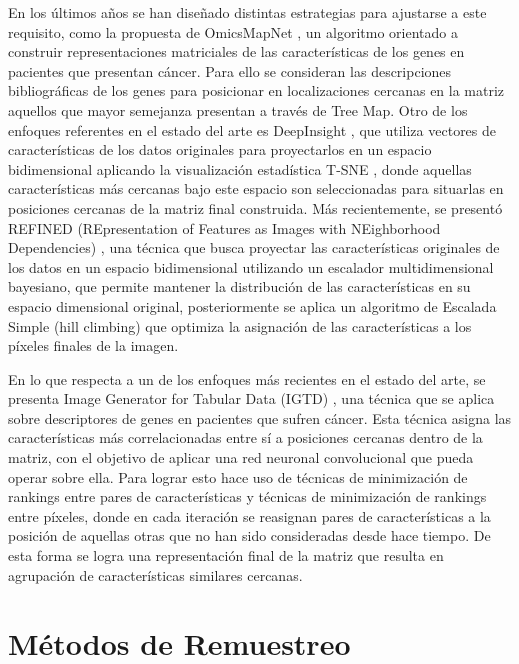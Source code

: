 \documentclass{uathesis-es}
\begin{document}
En los últimos años se han diseñado distintas estrategias para ajustarse a este requisito, como la propuesta de OmicsMapNet \cite{ma2019omicsmapnet}, un algoritmo orientado a construir representaciones matriciales de las características de los genes en pacientes que presentan cáncer. Para ello se consideran las descripciones bibliográficas de los genes para posicionar en localizaciones cercanas en la matriz aquellos que mayor semejanza presentan a través de Tree Map. Otro de los enfoques referentes en el estado del arte es DeepInsight \cite{Sharma2019}, que utiliza vectores de características de los datos originales para proyectarlos en un espacio bidimensional aplicando la visualización estadística T-SNE \cite{van2008visualizing}, donde aquellas características más cercanas bajo este espacio son seleccionadas para situarlas en posiciones cercanas de la matriz final construida. Más recientemente, se presentó REFINED (REpresentation of Features as Images with NEighborhood Dependencies) \cite{Bazgir2020}, una técnica que busca proyectar las características originales de los datos en un espacio bidimensional utilizando un escalador multidimensional bayesiano, que permite mantener la distribución de las características en su espacio dimensional original, posteriormente se aplica un algoritmo de Escalada Simple (hill climbing) que optimiza la asignación de las características a los píxeles finales de la imagen.

En lo que respecta a un de los enfoques más recientes en el estado del arte, se presenta Image Generator for Tabular Data (IGTD) \cite{Zhu2021}, una técnica que se aplica sobre descriptores de genes en pacientes que sufren cáncer. Esta técnica asigna las características más correlacionadas entre sí a posiciones cercanas dentro de la matriz, con el objetivo de aplicar una red neuronal convolucional que pueda operar sobre ella. Para lograr esto hace uso de técnicas de minimización de rankings entre pares de características y técnicas de minimización de rankings entre píxeles, donde en cada iteración se reasignan pares de características a la posición de aquellas otras que no han sido consideradas desde hace tiempo. De esta forma se logra una representación final de la matriz que resulta en agrupación de características similares cercanas.

\section{Métodos de Remuestreo}
\label{SOAT_RESAMPLING}
\end{document}
